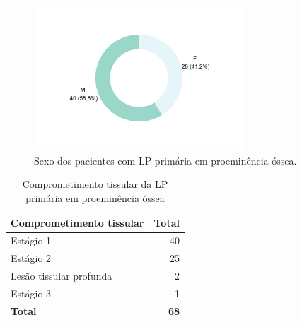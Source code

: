 \documentclass[
  a4paper]{article}
\begin{document}
\begin{figure}[H]
\caption{Sexo dos pacientes com LP primária em proeminência óssea.}
\includegraphics[width=0.7\textwidth]{Imagens/lesao_pressao_sexo.png}
\end{figure}

\begin{table}[H]

\caption{\label{tab:unnamed-chunk-16}Comprometimento tissular da LP primária em proeminência óssea}
\centering
\begin{tabular}[t]{lr}
\toprule
Comprometimento tissular & Total\\
\midrule
Estágio 1 & 40\\
Estágio 2 & 25\\
Lesão tissular profunda & 2\\
Estágio 3 & 1\\
\midrule
\textbf{Total} & \textbf{68}\\
\bottomrule
\end{tabular}
\end{table}
\end{document}
